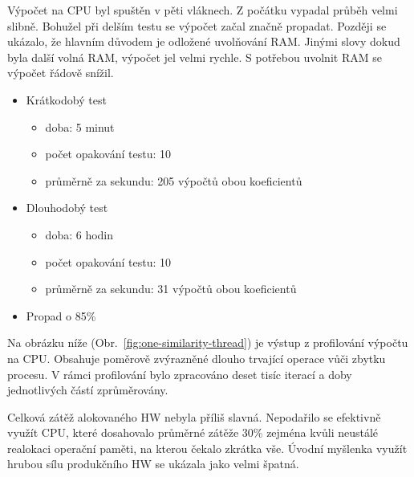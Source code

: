 Výpočet na CPU byl spuštěn v pěti vláknech. Z počátku vypadal průběh velmi slibně. Bohužel při delším testu se výpočet začal značně propadat. Později se ukázalo, že hlavním důvodem je odložené uvolňování RAM. Jinými slovy dokud byla další volná RAM, výpočet jel velmi rychle. S potřebou uvolnit RAM se výpočet řádově snížil.
\begin{itemize}
	\setlength{\parskip}{0pt}
	\setlength{\itemsep}{0pt}
	\item {Krátkodobý test}
		\begin{itemize}
			\setlength{\parskip}{0pt}
			\setlength{\itemsep}{0pt}
			\item {doba: 5 minut}
			\item {počet opakování testu: 10}
			\item {průměrně za sekundu: 205 výpočtů obou koeficientů}
		\end{itemize}
	\item {Dlouhodobý test}
		\begin{itemize}
			\setlength{\parskip}{0pt}
			\setlength{\itemsep}{0pt}
			\item {doba: 6 hodin}
			\item {počet opakování testu: 10}
			\item {průměrně za sekundu: 31 výpočtů obou koeficientů}
		\end{itemize}
	\item {Propad o 85\%}
\end{itemize}

Na obrázku níže (Obr.~\ref{fig:one-similarity-thread}) je výstup z profilování výpočtu na CPU. Obsahuje poměrově zvýrazněné dlouho trvající operace vůči zbytku procesu. V rámci profilování bylo zpracováno deset tisíc iterací a doby jednotlivých částí zprůměrovány.

Celková zátěž alokovaného HW nebyla příliš slavná. Nepodařilo se efektivně využít CPU, které dosahovalo průměrné zátěže 30\% zejména kvůli neustálé realokaci operační paměti, na kterou čekalo zkrátka vše.
Úvodní myšlenka využít hrubou sílu produkčního HW se ukázala jako velmi špatná.

